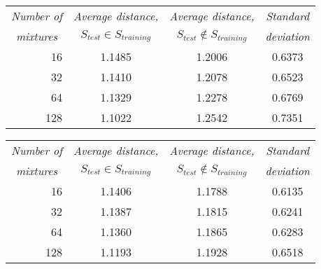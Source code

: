 \begin{table}[htbp]
	\begin{center}
		\begin{tabular}{r|c|cc}
			\toprule
				\multicolumn{1}{c}{\emph{Number of}} & \multicolumn{1}{c}{\emph{Average distance,}} & \multicolumn{1}{c}{\emph{Average distance,}} & \multicolumn{1}{c}{\emph{Standard}} \\
			\multicolumn{1}{c}{\emph{mixtures}}	& \multicolumn{1}{c}{$S_{test}\in S_{training}$} & \multicolumn{1}{c}{$S_{test}\notin S_{training}$} & \multicolumn{1}{c}{\emph{deviation}}\\
			\midrule
			16 & 1.1485 & 1.2006 & 0.6373\\
			32 & 1.1410 & 1.2078 & 0.6523\\
			64 & 1.1329 & 1.2278 & 0.6769\\
			128 & 1.1022 & 1.2542 & 0.7351\\
			\bottomrule			
		\end{tabular}		
	\end{center}
	\label{tab:accuracy_comparison_10k}	
\end{table}

\begin{table}[htbp]
	\begin{center}
		\begin{tabular}{r|c|cc}
			\toprule
			\multicolumn{1}{c}{\emph{Number of}} & \multicolumn{1}{c}{\emph{Average distance,}} & \multicolumn{1}{c}{\emph{Average distance,}} & \multicolumn{1}{c}{\emph{Standard}} \\
		\multicolumn{1}{c}{\emph{mixtures}}	& \multicolumn{1}{c}{$S_{test}\in S_{training}$} & \multicolumn{1}{c}{$S_{test}\notin S_{training}$} & \multicolumn{1}{c}{\emph{deviation}}\\
			\midrule
			16 & 1.1406 & 1.1788 & 0.6135\\
			32 & 1.1387 & 1.1815 & 0.6241\\
			64 & 1.1360 & 1.1865 & 0.6283\\
			128 & 1.1193 & 1.1928 & 0.6518\\
			\bottomrule			
		\end{tabular}		
	\end{center}
	\label{tab:accuracy_comparison_20k}	
\end{table}

